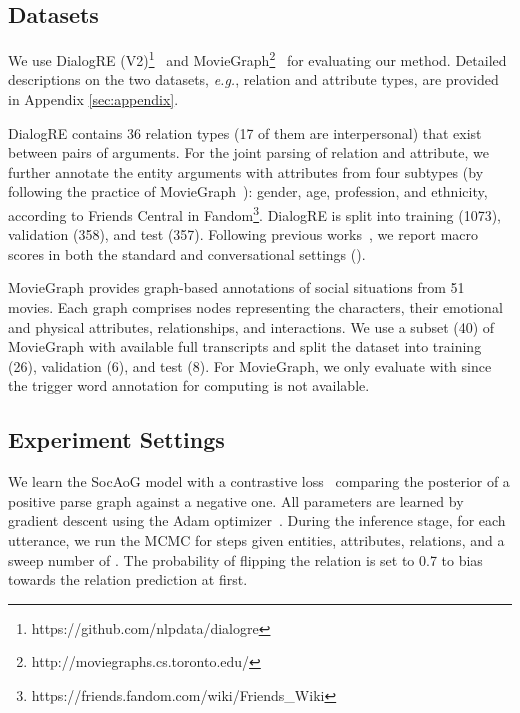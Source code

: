 \documentclass[11pt,a4paper]{article}
\begin{document}
\subsection{Datasets}
We use DialogRE (V2)\footnote{https://github.com/nlpdata/dialogre}~\citep{yu-etal-2020-dialogue} and MovieGraph\footnote{http://moviegraphs.cs.toronto.edu/}~\citep{vicol2018moviegraphs} for evaluating our method. Detailed descriptions on the two datasets, \textit{e.g.}, relation and attribute types, are provided in Appendix \ref{sec:appendix}. 

DialogRE contains 36 relation types (17 of them are interpersonal) that exist between pairs of arguments. For the joint parsing of relation and attribute, we further annotate the entity arguments with attributes from four subtypes (by following the practice of MovieGraph~\citep{vicol2018moviegraphs}): gender, age, profession, and ethnicity, according to Friends Central in Fandom\footnote{https://friends.fandom.com/wiki/Friends\_Wiki}. DialogRE is split into training (1073), validation (358), and test (357). Following previous works~\citep{yu-etal-2020-dialogue,xue2020gdpnet}, we report macro  scores in both the standard and conversational settings ().

MovieGraph provides graph-based annotations of social situations from 51 movies. Each graph comprises nodes representing the characters, their emotional and physical attributes, relationships, and interactions. We use a subset (40) of MovieGraph with available full transcripts and split the dataset into training (26), validation (6), and test (8). For MovieGraph, we only evaluate with  since the trigger word annotation for computing  is not available.

\subsection{Experiment Settings}
We learn the SocAoG model with a contrastive loss~\citep{hadsell2006dimensionality} comparing the posterior of a positive parse graph against a negative one. All parameters are learned by gradient descent using the Adam optimizer~\citep{kingma2014adam}. During the inference stage, for each utterance, we run the MCMC 
for  steps given  entities,  attributes,  relations, and a sweep number of . The probability of flipping the relation  is set to 0.7 to bias towards the relation prediction at first. 
\end{document}
